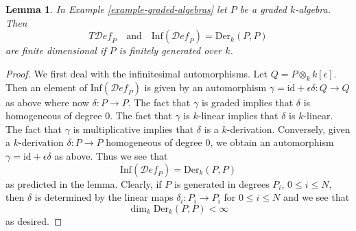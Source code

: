 \documentclass{stacks-project}
\theoremstyle{plain}
\newtheorem{lemma}[subsection]{Lemma}
\theoremstyle{definition}
\theoremstyle{remark}
\numberwithin{equation}{subsection}
\def\Deformationcategory{\mathcal{D}\!\mathit{ef}}
\begin{document}
\begin{lemma}
\label{lemma-graded-algebras-TI}
In Example \ref{example-graded-algebras} let $P$ be a graded $k$-algebra.
Then
$$
T\Deformationcategory_P
\quad\text{and}\quad
\text{Inf}(\Deformationcategory_P) = \text{Der}_k(P, P)
$$
are finite dimensional if $P$ is finitely generated over $k$.
\end{lemma}

\begin{proof}
We first deal with the infinitesimal automorphisms.
Let $Q = P \otimes_k k[\epsilon]$.
Then an element of $\text{Inf}(\Deformationcategory_P)$
is given by an automorphism
$\gamma = \text{id} + \epsilon \delta : Q \to Q$
as above where now $\delta : P \to P$.
The fact that $\gamma$ is graded implies that
$\delta$ is homogeneous of degree $0$.
The fact that $\gamma$ is $k$-linear implies that
$\delta$ is $k$-linear.
The fact that $\gamma$ is multiplicative implies that
$\delta$ is a $k$-derivation.
Conversely, given a $k$-derivation $\delta : P \to P$
homogeneous of degree $0$, we obtain an automorphism
$\gamma = \text{id} + \epsilon \delta$ as above.
Thus we see that
$$
\text{Inf}(\Deformationcategory_P) = \text{Der}_k(P, P)
$$
as predicted in the lemma.
Clearly, if $P$ is generated in degrees $P_i$,
$0 \leq i \leq N$, then $\delta$ is determined by
the linear maps $\delta_i : P_i \to P_i$ for
$0 \leq i \leq N$ and we see that
$$
\dim_k \text{Der}_k(P, P) < \infty
$$
as desired.


\end{proof}
\end{document}
